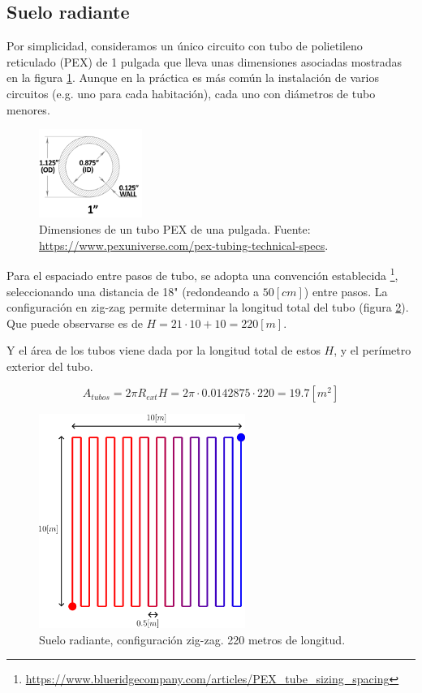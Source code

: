 \subsection{Suelo radiante}

Por simplicidad, consideramos un único circuito con tubo de polietileno reticulado (PEX) de 1
pulgada que lleva unas dimensiones asociadas mostradas en la figura
\ref{fig:1_inch_pex}.
Aunque en la práctica es más común la instalación de varios circuitos (e.g.
uno para cada habitación), cada uno con diámetros de tubo menores.

\begin{figure}[h] \centering
	\centering
	\includegraphics[width=0.3\textwidth]{./capitulos/resultados_discusion/images/1_inch_pex.png}
	\caption{Dimensiones de un tubo PEX de una pulgada. Fuente: \url{https://www.pexuniverse.com/pex-tubing-technical-specs}.}
	\label{fig:1_inch_pex}
\end{figure}


Para el espaciado entre pasos de tubo, se adopta una convención establecida
\footnote{\url{https://www.blueridgecompany.com/articles/PEX_tube_sizing_spacing}},
seleccionando una distancia de 18" (redondeando a $50[cm]$) entre pasos. La
configuración en zig-zag permite determinar la longitud total del tubo (figura
\ref{fig:esquema_tubos_suelo}). Que puede observarse es de $H = 21 \cdot 10 + 10 =
220[m]$.

Y el área de los tubos viene dada por la longitud total de estos $H$, y el
perímetro exterior del tubo.

\begin{equation}
	A_{tubos} = 2 \pi R_{ext} H = 2 \pi \cdot 0.0142875 \cdot 220 = 19.7[m^2]
\end{equation}


\begin{figure}[h] \centering
	\centering
	\includegraphics[width=0.6\textwidth]{./capitulos/resultados_discusion/images/esquema_tubos_suelo.png}
	\caption{Suelo radiante, configuración zig-zag. 220 metros de longitud.}
	\label{fig:esquema_tubos_suelo}
\end{figure}

